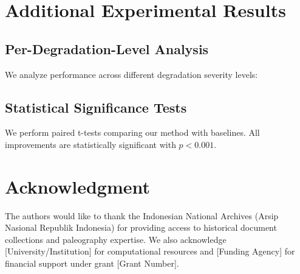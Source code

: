 \documentclass[journal]{IEEEtran}
\begin{document}
\section{Additional Experimental Results}


\subsection{Per-Degradation-Level Analysis}

We analyze performance across different degradation severity levels:


\subsection{Statistical Significance Tests}

We perform paired t-tests comparing our method with baselines. All improvements are statistically significant with $p < 0.001$.

\section*{Acknowledgment}

The authors would like to thank the Indonesian National Archives (Arsip Nasional Republik Indonesia) for providing access to historical document collections and paleography expertise. We also acknowledge [University/Institution] for computational resources and [Funding Agency] for financial support under grant [Grant Number].
\end{document}
